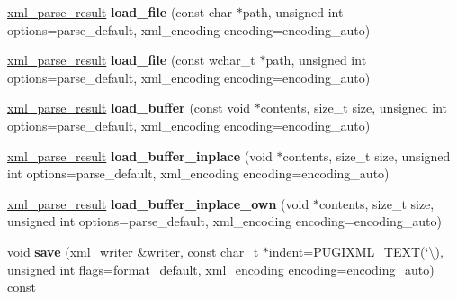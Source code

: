 \begin{DoxyCompactItemize}
\hyperlink{structpugi_1_1xml__parse__result}{xml\+\_\+parse\+\_\+result} {\bfseries load\+\_\+file} (const char $\ast$path, unsigned int options=parse\+\_\+default, xml\+\_\+encoding encoding=encoding\+\_\+auto)
\item 
\mbox{\label{classpugi_1_1xml__document_ac5a29d9c9e754120a5e0c072b332a25a}} 
\hyperlink{structpugi_1_1xml__parse__result}{xml\+\_\+parse\+\_\+result} {\bfseries load\+\_\+file} (const wchar\+\_\+t $\ast$path, unsigned int options=parse\+\_\+default, xml\+\_\+encoding encoding=encoding\+\_\+auto)
\item 
\mbox{\label{classpugi_1_1xml__document_ab29840790e26b2166a395c63a2b2d9bd}} 
\hyperlink{structpugi_1_1xml__parse__result}{xml\+\_\+parse\+\_\+result} {\bfseries load\+\_\+buffer} (const void $\ast$contents, size\+\_\+t size, unsigned int options=parse\+\_\+default, xml\+\_\+encoding encoding=encoding\+\_\+auto)
\item 
\mbox{\label{classpugi_1_1xml__document_a3e20650182ccbdd175ca069dd5e08632}} 
\hyperlink{structpugi_1_1xml__parse__result}{xml\+\_\+parse\+\_\+result} {\bfseries load\+\_\+buffer\+\_\+inplace} (void $\ast$contents, size\+\_\+t size, unsigned int options=parse\+\_\+default, xml\+\_\+encoding encoding=encoding\+\_\+auto)
\item 
\mbox{\label{classpugi_1_1xml__document_a9da4bdcdc4ad914fb0f4680b02983502}} 
\hyperlink{structpugi_1_1xml__parse__result}{xml\+\_\+parse\+\_\+result} {\bfseries load\+\_\+buffer\+\_\+inplace\+\_\+own} (void $\ast$contents, size\+\_\+t size, unsigned int options=parse\+\_\+default, xml\+\_\+encoding encoding=encoding\+\_\+auto)
\item 
\mbox{\label{classpugi_1_1xml__document_a3a116c9b2725e49b60a5b671b3242e8e}} 
void {\bfseries save} (\hyperlink{classpugi_1_1xml__writer}{xml\+\_\+writer} \&writer, const char\+\_\+t $\ast$indent=P\+U\+G\+I\+X\+M\+L\+\_\+\+T\+E\+XT(\char`\"{}\textbackslash{}), unsigned int flags=format\+\_\+default, xml\+\_\+encoding encoding=encoding\+\_\+auto) const
\item 
\mbox{\label{classpugi_1_1xml__document_a9cb952680df859df98f0eede7c3daa18}} 

\end{DoxyCompactItemize}
